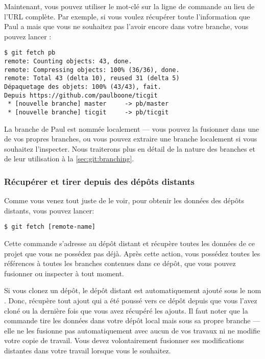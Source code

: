 Maintenant, vous pouvez utiliser le mot-clé  sur la ligne de commande au lieu de l'URL complète.
Par exemple, si vous voulez récupérer toute l'information que Paul a mais que vous ne souhaitez pas l'avoir encore dans votre branche, vous pouvez lancer :
\begin{Schunk}
\begin{Verbatim}
$ git fetch pb
remote: Counting objects: 43, done.
remote: Compressing objects: 100% (36/36), done.
remote: Total 43 (delta 10), reused 31 (delta 5)
Dépaquetage des objets: 100% (43/43), fait.
Depuis https://github.com/paulboone/ticgit
 * [nouvelle branche] master     -> pb/master
 * [nouvelle branche] ticgit     -> pb/ticgit
\end{Verbatim}
\end{Schunk}

La branche  de Paul est nommée localement  --- vous pouvez la fusionner dans une de vos propres branches, ou vous pouvez extraire une branche localement si vous souhaitez l'inspecter. Nous traiterons plus en détail de la nature des branches et de leur utilisation à la \autoref{sec:git:branching}.

\subsubsection{Récupérer et tirer depuis des dépôts distants}
\label{sec:git:fetching_and_pulling}

Comme vous venez tout juste de le voir, pour obtenir les données des dépôts distants, vous pouvez lancer:
\begin{Schunk}
\begin{Verbatim}
$ git fetch [remote-name]
\end{Verbatim}
\end{Schunk}

Cette commande s'adresse au dépôt distant et récupère toutes les données de ce projet que vous ne possédez pas déjà.
Après cette action, vous possédez toutes les références à toutes les branches contenues dans ce dépôt, que vous pouvez fusionner ou inspecter à tout moment.

Si vous clonez un dépôt, le dépôt distant est automatiquement ajouté sous le nom .
Donc,  récupère tout ajout qui a été poussé vers ce dépôt depuis que vous l'avez cloné ou la dernière fois que vous avez récupéré les ajouts.
Il faut noter que la commande  tire les données dans votre dépôt local mais sous sa propre branche --- elle ne les fusionne pas automatiquement avec aucun de vos travaux ni ne modifie votre copie de travail.
Vous devez volontairement fusionner ses modifications distantes dans votre travail lorsque vous le souhaitez.

